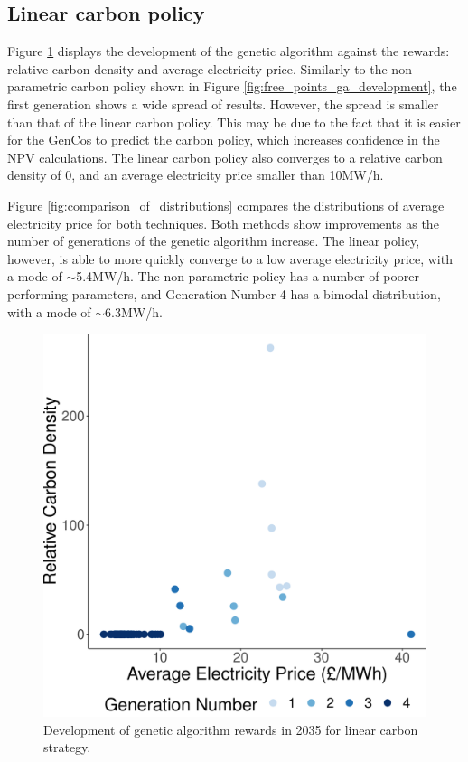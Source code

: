 \subsection{Linear carbon policy}
\label{sssec:result_linear_carbon_strategy}

Figure \ref{fig:linear_ga_development} displays the development of the genetic algorithm against the rewards: relative carbon density and average electricity price. Similarly to the non-parametric carbon policy shown in Figure \ref{fig:free_points_ga_development}, the first generation shows a wide spread of results. However, the spread is smaller than that of the linear carbon policy. This may be due to the fact that it is easier for the GenCos to predict the carbon policy, which increases confidence in the NPV calculations. The linear carbon policy also converges to a relative carbon density of 0, and an average electricity price smaller than \textsterling10MW/h.

Figure \ref{fig:comparison_of_distributions} compares the distributions of average electricity price for both techniques. Both methods show improvements as the number of generations of the genetic algorithm increase.  The linear policy, however, is able to more quickly converge to a low average electricity price, with a mode of ${\sim}$\textsterling5.4MW/h. The non-parametric policy has a number of poorer performing parameters, and Generation Number 4 has a bimodal distribution, with a mode of ${\sim}$\textsterling6.3MW/h.

\begin{figure}
	\centering
	\includegraphics[width=0.70\linewidth]{Chapter6/figures/results/linear_ga_development.pdf}
	\caption{Development of genetic algorithm rewards in 2035 for linear carbon strategy.}
	\label{fig:linear_ga_development}
\end{figure}


